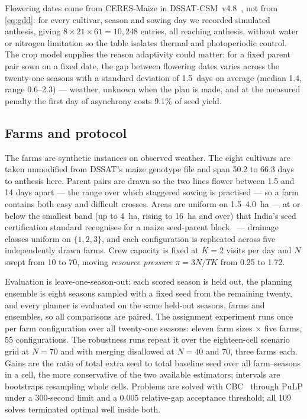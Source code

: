 \documentclass[10pt,twocolumn]{article}
\begin{document}
Flowering dates come from CERES-Maize in DSSAT-CSM~v4.8~\cite{dssat}, not
from \eqref{eq:gdd}: for every cultivar, season and sowing day we recorded
simulated anthesis, giving $8 \times 21 \times 61 = 10{,}248$ entries, all
reaching anthesis, without water or nitrogen limitation so the table
isolates thermal and photoperiodic control. The crop model supplies the
reason adaptivity could matter: for a fixed parent pair sown on a fixed
date, the gap between flowering dates varies across the twenty-one seasons
with a standard deviation of 1.5~days on average (median 1.4, range
0.6--2.3) --- weather, unknown when the plan is made, and at the measured
penalty the first day of asynchrony costs 9.1\% of seed yield.

\subsection{Farms and protocol}

The farms are synthetic instances on observed weather. The eight cultivars
are taken unmodified from DSSAT's maize genotype file and span 50.2 to 66.3
days to anthesis here. Parent pairs are drawn so the two lines flower
between 1.5 and 14 days apart --- the range over which staggered sowing is
practised --- so a farm contains both easy and difficult crosses. Areas are
uniform on 1.5--4.0~ha --- at or below the smallest band (up to 4~ha, rising to 16~ha and over) that India's seed certification standard recognises for a maize seed-parent block~\cite{iscs2013} --- drainage classes uniform on $\{1,2,3\}$, and each
configuration is replicated across five independently drawn farms. Crew
capacity is fixed at $K = 2$ visits per day and $N$ swept from 10 to 70,
moving \emph{resource pressure} $\pi = 3N/TK$ from 0.25 to 1.72.

Evaluation is leave-one-season-out: each scored season is held out, the
planning ensemble is eight seasons sampled with a fixed seed from the
remaining twenty, and every planner is evaluated on the same held-out
seasons, farms and ensembles, so all comparisons are paired. The assignment
experiment runs once per farm configuration over all twenty-one seasons:
eleven farm sizes $\times$ five farms, 55 configurations. The robustness
runs repeat it over the eighteen-cell scenario grid at $N = 70$ and with
merging disallowed at $N = 40$ and $70$, three farms each. Gains are the
ratio of total extra seed to total baseline seed over all farm--seasons in a
cell, the more conservative of the two available estimators; intervals are
bootstraps resampling whole cells. Problems are solved with CBC~\cite{cbc}
through PuLP under a 300-second limit and a $0.005$ relative-gap acceptance
threshold; all 109 solves terminated optimal well inside both.
\end{document}
